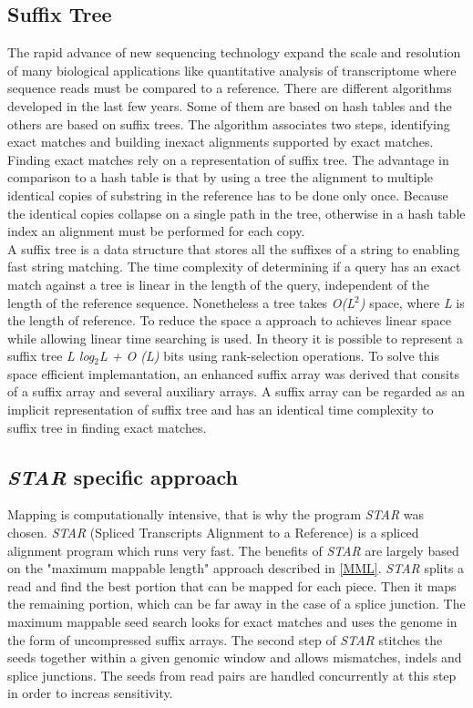 \documentclass[12pt, a4paper]{report}
\begin{document}
\subsection{Suffix Tree}
The rapid advance of new sequencing technology expand the scale and resolution of many biological applications like quantitative analysis of transcriptome where sequence reads must be compared to a reference. There are different algorithms developed in the last few years. Some of them are based on hash tables and the others are based on suffix trees. The algorithm associates two steps, identifying exact matches and building inexact alignments supported by exact matches. Finding exact matches rely on a representation of suffix tree. 
The advantage in comparison to a hash table is that by using a tree the alignment to multiple identical copies of substring in the reference has to be done only once. Because the identical copies collapse on a single path in the tree, otherwise in a hash table index an alignment must be performed for each copy. \cite{Li2010} \\
A suffix tree is a data structure that stores all the suffixes of a string to enabling fast string matching. The time complexity of determining if a query has an exact match against a tree is linear in the length of the query, independent of the length of the reference sequence. Nonetheless a tree takes \textit{O(L$^2$)} space, where \textit{L} is the length of reference. To reduce the space a approach to achieves linear space while allowing linear time searching is used. In theory it is possible to represent a suffix tree \textit{L log$_2$L + O (L)} bits using rank-selection operations. To solve this space efficient implemantation,  an enhanced suffix array was derived that consits of a suffix array and several auxiliary arrays. A suffix array can be regarded as an implicit representation of suffix tree and has an identical time complexity to suffix tree in finding exact matches. \cite{Li2010}

\subsection{\textit{STAR} specific approach}
Mapping is computationally intensive, that is why the program \textit{STAR} was chosen. \textit{STAR} (Spliced Transcripts Alignment to a Reference) is a spliced alignment program which runs very fast. The benefits of \textit{STAR} are largely based on the "maximum mappable length" approach described in \ref{MML}. \textit{STAR} splits a read and find the best portion that can be mapped for each piece. Then it maps the remaining portion, which can be far away in the case of a splice junction. The maximum mappable seed search looks for exact matches and uses the genome in the form of uncompressed suffix arrays. The second step of \textit{STAR} stitches the seeds together within a given genomic window and allows mismatches, indels and splice junctions. The seeds from read pairs are handled concurrently at this step in order to increas sensitivity. \cite{Dobin2013, Korpelainen2014}
\end{document}
